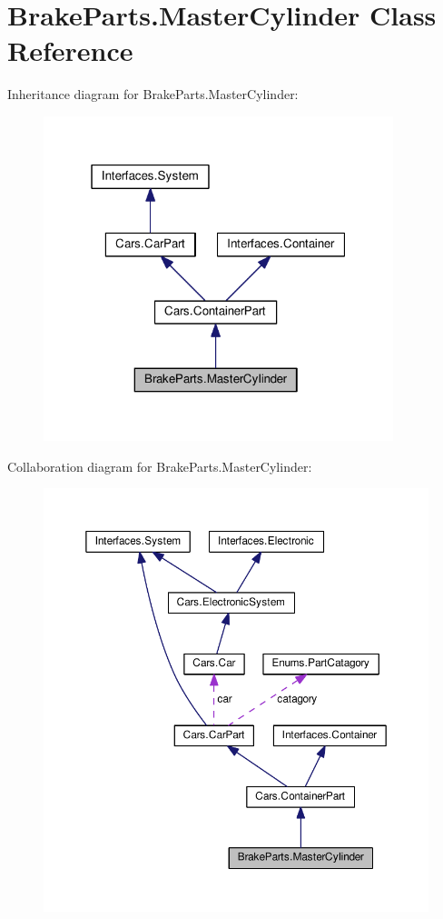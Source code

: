 \hypertarget{classBrakeParts_1_1MasterCylinder}{}\section{Brake\+Parts.\+Master\+Cylinder Class Reference}
\label{classBrakeParts_1_1MasterCylinder}


Inheritance diagram for Brake\+Parts.\+Master\+Cylinder\+:
\nopagebreak
\begin{figure}[H]
\begin{center}
\leavevmode
\includegraphics[width=289pt]{classBrakeParts_1_1MasterCylinder__inherit__graph}
\end{center}
\end{figure}


Collaboration diagram for Brake\+Parts.\+Master\+Cylinder\+:
\nopagebreak
\begin{figure}[H]
\begin{center}
\leavevmode
\includegraphics[width=350pt]{classBrakeParts_1_1MasterCylinder__coll__graph}
\end{center}
\end{figure}
